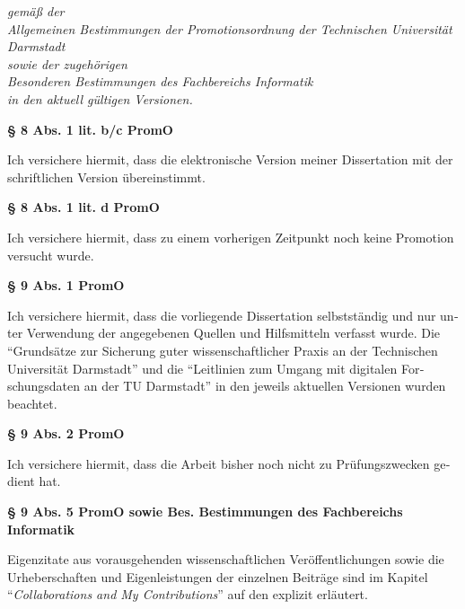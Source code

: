
\begin{otherlanguage}{ngerman}



    \begin{flushright}
        \emph{\small gemäß der \\
        Allgemeinen Bestimmungen der Promotionsordnung der Technischen Universität Darmstadt \\
        sowie der zugehörigen \\
        Besonderen Bestimmungen des Fachbereichs Informatik \\
        in den aktuell gültigen Versionen.}
    \end{flushright}

    {\setlength{\parindent}{0pt}

    \textbf{§ 8 Abs. 1 lit. b/c PromO}

    Ich versichere hiermit, dass die elektronische Version meiner Dissertation mit der schriftlichen Version übereinstimmt.

    \textbf{§ 8 Abs. 1 lit. d PromO}

    Ich versichere hiermit, dass zu einem vorherigen Zeitpunkt noch keine Promotion versucht wurde.

    \textbf{§ 9 Abs. 1 PromO}

    Ich versichere hiermit, dass die vorliegende Dissertation selbstständig und nur unter Verwendung der angegebenen  Quellen und Hilfsmitteln verfasst wurde. Die \enquote{Grundsätze zur Sicherung guter wissenschaftlicher Praxis an der Technischen Universität Darmstadt} und die \enquote{Leitlinien zum Umgang mit digitalen Forschungsdaten an der TU Darmstadt} in den jeweils aktuellen Versionen wurden beachtet.

    \textbf{§ 9 Abs. 2 PromO}

    Ich versichere hiermit, dass die Arbeit bisher noch nicht zu Prüfungszwecken gedient hat.

    \textbf{§ 9 Abs. 5 PromO sowie Bes. Bestimmungen des Fachbereichs Informatik}

    Eigenzitate aus vorausgehenden wissenschaftlichen Veröffentlichungen sowie die Urheberschaften und Eigenleistungen der einzelnen Beiträge sind im Kapitel \enquote{\emph{Collaborations and My Contributions}} auf den  explizit erläutert.

}
\end{otherlanguage}
